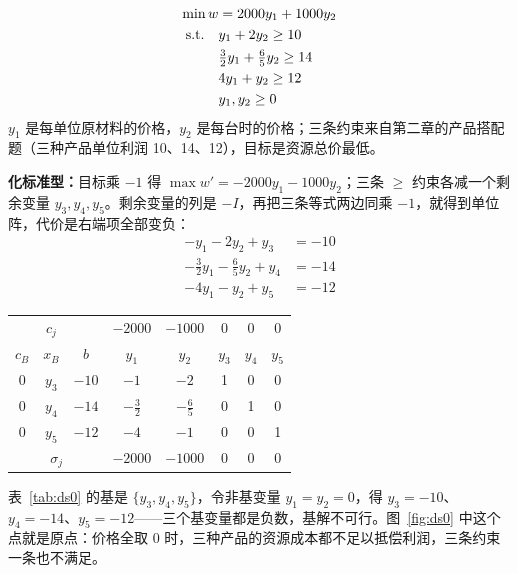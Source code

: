 \begin{examplebox}
\[
\begin{aligned}
\min w&=2000y_1+1000y_2\\
\text{s.t.}\quad &y_1+2y_2\ge10\\
&\tfrac32y_1+\tfrac65y_2\ge14\\
&4y_1+y_2\ge12\\
&y_1,y_2\ge0
\end{aligned}
\]
$y_1$ 是每单位原材料的价格，$y_2$ 是每台时的价格；三条约束来自第二章的产品搭配题（三种产品单位利润 10、14、12），目标是资源总价最低。\par
\textbf{化标准型：}目标乘 $-1$ 得 $\max w'=-2000y_1-1000y_2$；三条 $\ge$ 约束各减一个剩余变量 $y_3,y_4,y_5$。剩余变量的列是 $-I$，再把三条等式两边同乘 $-1$，就得到单位阵，代价是右端项全部变负：
\[
\begin{aligned}
-y_1-2y_2+y_3&=-10\\
-\tfrac32y_1-\tfrac65y_2+y_4&=-14\\
-4y_1-y_2+y_5&=-12
\end{aligned}
\]

\begin{center}\small
\begin{tabular}{@{}ccc|ccccc@{}}
\toprule
& $c_j$ & & $-2000$ & $-1000$ & 0 & 0 & 0\\
$c_B$ & $x_B$ & $b$ & $y_1$ & $y_2$ & $y_3$ & $y_4$ & $y_5$\\\midrule
0 & $y_3$ & \cellcolor{lightred}$-10$ & $-1$ & $-2$ & 1 & 0 & 0\\
0 & $y_4$ & \cellcolor{lightred}$-14$ & $-\frac32$ & $-\frac65$ & 0 & 1 & 0\\
0 & $y_5$ & \cellcolor{lightred}$-12$ & $-4$ & $-1$ & 0 & 0 & 1\\\midrule
\multicolumn{3}{c|}{$\sigma_j$} & \cellcolor{lightgreen}$-2000$ & \cellcolor{lightgreen}$-1000$ & \cellcolor{lightgreen}0 & \cellcolor{lightgreen}0 & \cellcolor{lightgreen}0\\\bottomrule
\end{tabular}\par\nopagebreak[4]
\label{tab:ds0}
\end{center}
\end{examplebox}

表~\ref{tab:ds0} 的基是 $\{y_3,y_4,y_5\}$，令非基变量 $y_1=y_2=0$，得 $y_3=-10$、$y_4=-14$、$y_5=-12$——三个基变量都是负数，基解不可行。图~\ref{fig:ds0} 中这个点就是原点：价格全取 0 时，三种产品的资源成本都不足以抵偿利润，三条约束一条也不满足。

